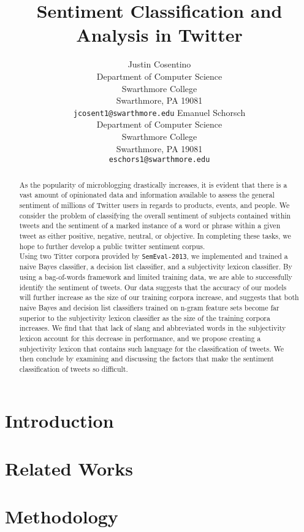 \documentclass[11pt]{article}
\title{Sentiment Classification and Analysis in Twitter}
\author{Justin Cosentino\\
  Department of Computer Science\\
  Swarthmore College\\
  Swarthmore, PA 19081\\
  {\tt jcosent1@swarthmore.edu}  
  \And                            
  Emanuel Schorsch\\                 
  Department of Computer Science\\
  Swarthmore College\\
  Swarthmore, PA 19081\\
  {\tt eschors1@swarthmore.edu}}
\date{}
\begin{document}
\maketitle
\begin{abstract}
As the popularity of microblogging drastically increases, it is evident that there is a vast amount of opinionated data and information available to assess the general sentiment of millions of Twitter users in regards to products, events, and people. We consider the problem of classifying the overall sentiment of subjects contained within tweets and the sentiment of a marked instance of a word or phrase within a given tweet as either positive, negative, neutral, or objective. In completing these tasks, we hope to further develop a public twitter sentiment corpus.\\

Using two Titter corpora provided by {\tt SemEval-2013}, we implemented and trained a naive Bayes classifier, a decision list classifier, and a subjectivity lexicon classifier. By using a bag-of-words framework and limited training data, we are able to successfully identify the sentiment of tweets. Our data suggests that the accuracy of our models will further increase as the size of our training corpora increase, and suggests that both naive Bayes and decision list classifiers trained on n-gram feature sets become far superior to the subjectivity lexicon classifier as the size of the training corpora increases. We find that that lack of slang and abbreviated words in the subjectivity lexicon account for this decrease in performance, and we propose creating a subjectivity lexicon that contains such language for the classification of tweets. We then conclude by examining and discussing the factors that make the sentiment classification of tweets so difficult. 

\end{abstract}

\section{Introduction}

\section{Related Works}

\section{Methodology}
\end{document}
